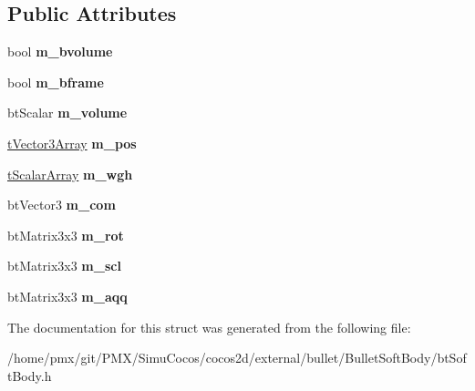 \subsection*{Public Attributes}
\begin{DoxyCompactItemize}
\item 
\mbox{\label{structbtSoftBody_1_1Pose_a359673dbb1d50f586ae6e77924e9d8ac}} 
bool {\bfseries m\+\_\+bvolume}
\item 
\mbox{\label{structbtSoftBody_1_1Pose_adf09c94d97fb44f3b88c3b1832776766}} 
bool {\bfseries m\+\_\+bframe}
\item 
\mbox{\label{structbtSoftBody_1_1Pose_a4806127851c12e3df29b1097aa3723c9}} 
bt\+Scalar {\bfseries m\+\_\+volume}
\item 
\mbox{\label{structbtSoftBody_1_1Pose_aa6cae81e27e3a4c8990423f2fa6bf182}} 
\hyperlink{classbtAlignedObjectArray}{t\+Vector3\+Array} {\bfseries m\+\_\+pos}
\item 
\mbox{\label{structbtSoftBody_1_1Pose_ad734471e031d5105259ebab2f9de71c9}} 
\hyperlink{classbtAlignedObjectArray}{t\+Scalar\+Array} {\bfseries m\+\_\+wgh}
\item 
\mbox{\label{structbtSoftBody_1_1Pose_a5083f27c5671f4ff377a6ee4d601ec6e}} 
bt\+Vector3 {\bfseries m\+\_\+com}
\item 
\mbox{\label{structbtSoftBody_1_1Pose_ac84ae4951c58adeee86b8e6113f2e2d2}} 
bt\+Matrix3x3 {\bfseries m\+\_\+rot}
\item 
\mbox{\label{structbtSoftBody_1_1Pose_a15a4fa7fa548a96678aae8dc8e259d34}} 
bt\+Matrix3x3 {\bfseries m\+\_\+scl}
\item 
\mbox{\label{structbtSoftBody_1_1Pose_aade9009495e18ebbaebfdf029fc0fca0}} 
bt\+Matrix3x3 {\bfseries m\+\_\+aqq}
\end{DoxyCompactItemize}


The documentation for this struct was generated from the following file\+:\begin{DoxyCompactItemize}
\item 
/home/pmx/git/\+P\+M\+X/\+Simu\+Cocos/cocos2d/external/bullet/\+Bullet\+Soft\+Body/bt\+Soft\+Body.\+h\end{DoxyCompactItemize}
